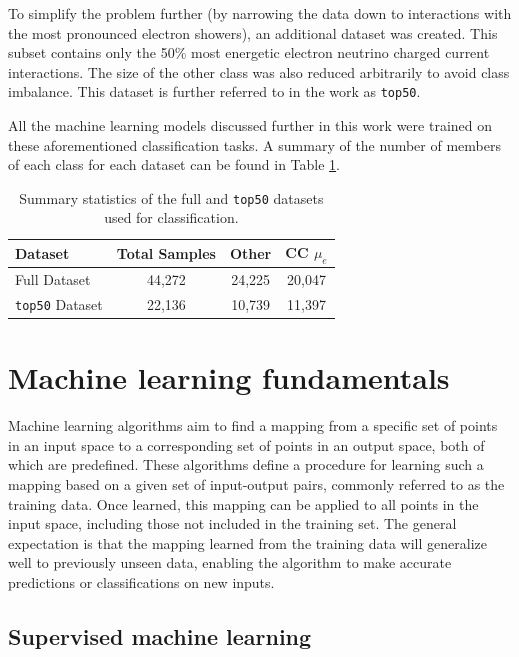 \documentclass{pracalicmgr}
\begin{document}
To simplify the problem further (by narrowing the data down to interactions with the most pronounced electron showers), an additional dataset was created. This subset contains only the 50\% most energetic electron neutrino charged current interactions. The size of the other class was also reduced arbitrarily to avoid class imbalance. This dataset is further referred to in the work as \texttt{top50}.

All the machine learning models discussed further in this work were trained on these aforementioned classification tasks. A summary of the number of members of each class for each dataset can be found in Table \ref{tab:dataset_stats}.


\begin{table}[h]
    \centering
    \caption{Summary statistics of the full and \texttt{top50} datasets used for classification.}
    \label{tab:dataset_stats}
    \begin{tabular}{lccc}
        \toprule
        \textbf{Dataset} & \textbf{Total Samples} & \textbf{Other} & \textbf{CC $\mu_e$ } \\
        \midrule
        Full Dataset     & 44,272                 & 24,225 & 20,047 \\
        \texttt{top50} Dataset & 22,136                 & 10,739 & 11,397 \\
        \bottomrule
    \end{tabular}
\end{table}

\chapter{Machine learning fundamentals}

Machine learning algorithms aim to find a mapping from a specific set of points in an input space to a corresponding set of points in an output space, both of which are predefined. These algorithms define a procedure for learning such a mapping based on a given set of input-output pairs, commonly referred to as the training data. Once learned, this mapping can be applied to all points in the input space, including those not included in the training set. The general expectation is that the mapping learned from the training data will generalize well to previously unseen data, enabling the algorithm to make accurate predictions or classifications on new inputs.

\section{Supervised machine learning}
\end{document}

